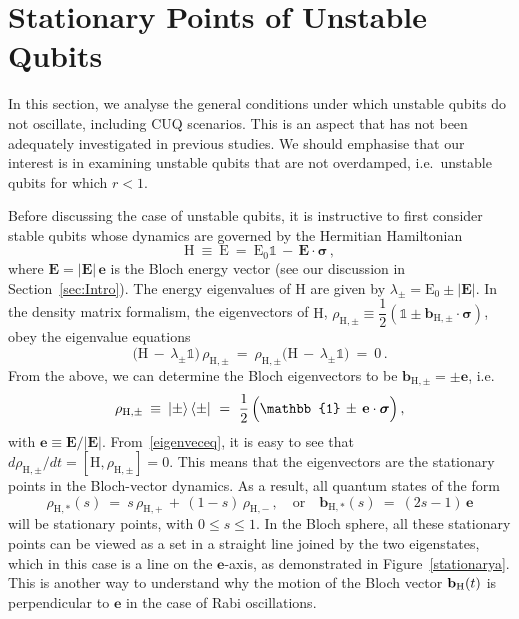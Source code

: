 \documentclass[12pt,a4paper]{article}
\begin{document}
\section{Stationary Points of Unstable Qubits}\label{sec:Stationarypnts}

In this section, we analyse the general conditions under which unstable qubits do not oscillate, including CUQ scenarios. This is an aspect that has not been adequately investigated in previous studies\cite{Brody:2012nxf,Rembielinski:2021adg,Karamitros:2022oew,Karamitros:2025azy}. 
We should emphasise that our interest is in examining unstable qubits that are not overdamped, i.e.~unstable qubits for which $r<1$.

Before discussing the case of unstable qubits, it is instructive to first consider stable qubits whose dynamics are governed by the Hermitian Hamiltonian  
\begin{equation}
   \label{eq:Hstable}
  \mathrm{H}\: \equiv\: \text{E}\ =\ \mathrm{E}_0\mathbb{1}\, -\, \mathbf{E}\cdot \boldsymbol{\sigma}\,,  
\end{equation}
where $\mathbf{E} = |\mathbf{E}|\,\mathbf{e}$ is the Bloch energy vector (see our discussion in Section~\ref{sec:Intro}). The energy eigenvalues of $\mathrm{H}$ are given by $\lambda_{\pm} = \mathrm{E}_0\pm |\mathbf{E}|$. In the density matrix formalism, the eigenvectors of $\mathrm{H}$, $\rho_{\mathrm{H},\pm} \equiv \dfrac{1}{2}(\mathbb{1}\pm\mathbf{b}_{\mathrm{H},\pm}\cdot\boldsymbol{\sigma})$, obey the eigenvalue equations 
\begin{equation}
    \Big(\mathrm{H}\, -\, \lambda_{\pm}\mathbb{1}\Big)\,\rho_{\mathrm{H},\pm}\: =\: \rho_{\mathrm{H},\pm}\Big(\mathrm{H}\, -\, \lambda_{\pm}\mathbb{1}\Big)\: =\: 0\,.\label{eigenveceq}
\end{equation}
From the above, we can determine the Bloch eigenvectors to be $\mathbf{b}_{\mathrm{H},\pm} = \pm \mathbf{e}$, i.e. 
\begin{equation}
    \rho_{\mathrm{H},\pm}\: \equiv\: \ket{\pm}\bra{\pm}\ =\ \frac{1}{2}\,\Big(\mathbb{1}\, \pm\, \mathbf{e}\cdot\boldsymbol{\sigma}\Big)\,,
\end{equation}
with $\mathbf{e} \equiv \mathbf{E}/|\mathbf{E}|$. 
From~\eqref{eigenveceq}, it is easy to see that $d\rho_{\mathrm{H},\pm}/dt = [\mathrm{H},\rho_{\mathrm{H},\pm}] = 0$. This means that the eigenvectors are the stationary points in the Bloch-vector dynamics. As a result, all quantum states of the form 
\begin{equation}
  \label{eq:rhoHstar}
\rho_{\text{H},*}(s)\: =\: s\,\rho_{\text{H},+}\, +\, (1-s)\,\rho_{\text{H},-}\,,\quad \mbox{or}\quad \mathbf{b}_{\text{H},*}(s)\: =\: (2s-1)\,\mathbf{e}
\end{equation}
will be stationary points, with $0\leq s\le 1$. In the Bloch sphere, all these stationary points can be viewed as a set in a straight line joined by the two eigenstates, which in this case is a line on the $\mathbf{e}$-axis, as demonstrated in Figure~\ref{stationarya}. This is another way to understand why the motion of the Bloch vector ${\bf b}_\text{H}(t)$  is perpendicular to $\mathbf{e}$ in the case of Rabi oscillations.
\end{document}
